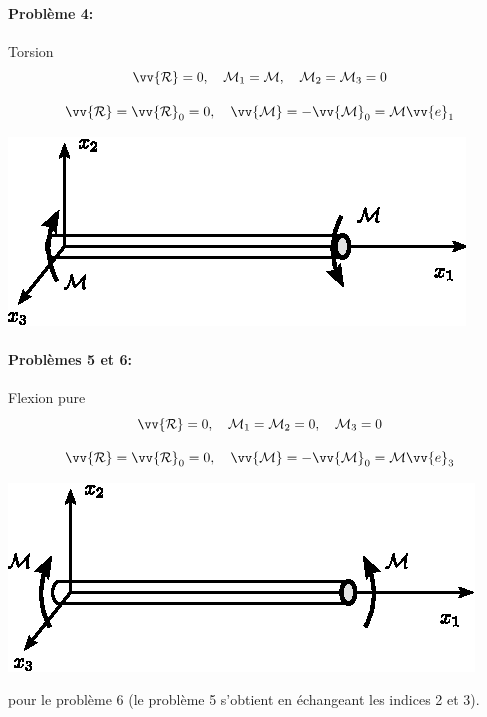 \paragraph{Problème 4:} Torsion
\begin{equation}
    \vv{\mathcal{R}} = 0 , \quad \mathcal{M}_1 = \mathcal{M}, \quad \mathcal{M}_2 = \mathcal{M}_3 = 0
    \label{eq:Ch07-011}
\end{equation}
\begin{multicols}{2}
    \begin{equation*}
        \vv{\mathcal{R}} = \vv{\mathcal{R}}_0 = 0, \quad \vv{\mathcal{M}} = -\vv{\mathcal{M}}_0 = \mathcal{M} \vv{e}_1
    \end{equation*}
    \columnbreak
    \begin{center}
        \includegraphics{../images/T1_Ch07-04}
    \end{center}
\end{multicols}
\paragraph{Problèmes 5 et 6:} Flexion pure
\begin{equation}
    \vv{\mathcal{R}} = 0 , \quad \mathcal{M}_1 = \mathcal{M}_2 = 0, \quad \mathcal{M}_3 = 0
    \label{eq:Ch07-012}
\end{equation}
\begin{multicols}{2}
    \begin{equation*}
        \vv{\mathcal{R}} = \vv{\mathcal{R}}_0 = 0, \quad \vv{\mathcal{M}} = -\vv{\mathcal{M}}_0 = \mathcal{M} \vv{e}_3
    \end{equation*}
    \columnbreak
    \begin{center}
        \includegraphics{../images/T1_Ch07-05}
    \end{center}
\end{multicols}
pour le problème 6 (le problème 5 s'obtient en échangeant les indices 2 et 3).

